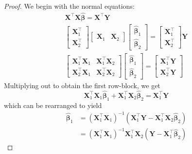 \documentclass[11pt]{report} %
\begin{document}
\begin{proof}
We begin with the normal equations:
\begin{gather}
\mathbf{X}^{\top}\mathbf{X}\widehat{\boldsymbol{\beta}} = \mathbf{X}^{\top}\mathbf{Y} \\
\begin{bmatrix} \mathbf{X}_{1}^{\top} \\ \mathbf{X}_{2}^{\top} \end{bmatrix}\begin{bmatrix} \mathbf{X}_{1} & \mathbf{X}_{2} \end{bmatrix}\begin{bmatrix} \widehat{\boldsymbol{\beta}}_{1} \\ \widehat{\boldsymbol{\beta}}_{2} \end{bmatrix} = \begin{bmatrix} \mathbf{X}_{1}^{\top} \\ \mathbf{X}_{2}^{\top} \end{bmatrix}\mathbf{Y} \\
\begin{bmatrix}\mathbf{X}_{1}^{\top}\mathbf{X}_{1} & \mathbf{X}_{1}^{\top}\mathbf{X}_{2}\\
\mathbf{X}_{2}^{\top}\mathbf{X}_{1} & \mathbf{X}_{2}^{\top}\mathbf{X}_{2}
\end{bmatrix}\begin{bmatrix}\widehat{\boldsymbol{\beta}}_{1}\\
\widehat{\boldsymbol{\beta}}_{2}
\end{bmatrix}=\begin{bmatrix}\mathbf{X}_{1}^{\top}\mathbf{Y}\\
\mathbf{X}_{2}^{\top}\mathbf{Y}
\end{bmatrix}
\end{gather}
Multiplying out to obtain the first row-block, we get
\begin{equation}
\mathbf{X}_{1}^{\top}\mathbf{X}_{1}\widehat{\boldsymbol{\beta}}_{1}+\mathbf{X}_{1}^{\top}\mathbf{X}_{2}\widehat{\boldsymbol{\beta}}_{2}=\mathbf{X}_{1}^{\top}\mathbf{Y}
\end{equation}
which can be rearranged to yield
\begin{align}
\widehat{\boldsymbol{\beta}}_{1} &= \left(\mathbf{X}_{1}^{\top}\mathbf{X}_{1}\right)^{-1}\left(\mathbf{X}_{1}^{\top}\mathbf{Y}-\mathbf{X}_{1}^{\top}\mathbf{X}_{2}\widehat{\boldsymbol{\beta}}_{2}\right) \\
&= \left(\mathbf{X}_{1}^{\top}\mathbf{X}_{1}\right)^{-1}\mathbf{X}_{1}^{\top}\mathbf{X}_{2}\left(\mathbf{Y}-\mathbf{X}_{1}^{\top}\widehat{\boldsymbol{\beta}}_{2}\right)

\end{align}
\end{proof}
\end{document}
